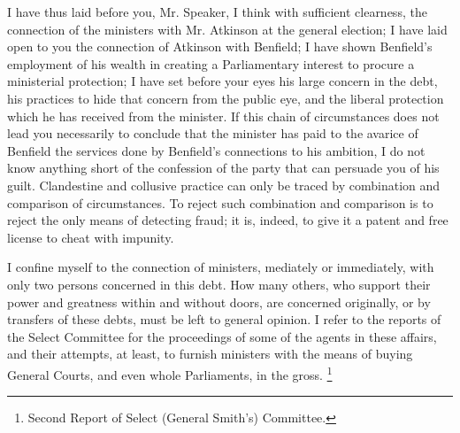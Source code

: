 I have thus laid before you, Mr. Speaker, I think with sufficient clearness, the connection of the ministers with Mr. Atkinson at the general election; I have laid open to you the connection of Atkinson with Benfield; I have shown Benfield's employment of his wealth in creating a Parliamentary interest to procure a ministerial protection; I have set before your eyes his large concern in the debt, his practices to hide that concern from the public eye, and the liberal protection which he has received from the minister. If this chain of circumstances does not lead you necessarily to conclude that the minister has paid to the avarice of Benfield the services done by Benfield's connections to his ambition, I do not know anything short of the confession of the party that can persuade you of his guilt. Clandestine and collusive practice can only be traced by combination and comparison of circumstances. To reject such combination and comparison is to reject the only means of detecting fraud; it is, indeed, to give it a patent and free license to cheat with impunity.

I confine myself to the connection of ministers, mediately or immediately, with only two persons concerned in this debt. How many others, who support their power and greatness within and without doors, are concerned originally, or by transfers of these debts, must be left to general opinion. I refer to the reports of the Select Committee for the proceedings of some of the agents in these affairs, and their attempts, at least, to furnish ministers with the means of buying General Courts, and even whole Parliaments, in the gross.
\footnote{ Second Report of Select (General Smith's) Committee.}


